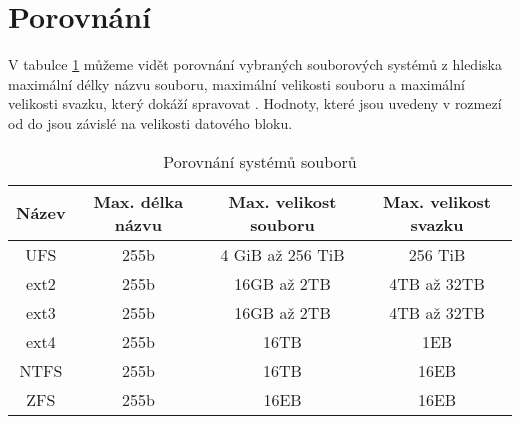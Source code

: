 \section{Porovnání}
    V tabulce \ref{fscompare} můžeme vidět porovnání vybraných souborových systémů z hlediska maximální délky názvu souboru, maximální velikosti souboru a maximální velikosti svazku, který dokáží spravovat \cite{data}. Hodnoty, které jsou uvedeny v rozmezí od do jsou závislé na velikosti datového bloku.
    \begin{table}
    \centering
    \caption{Porovnání systémů souborů}
    \label{fscompare}
    \begin{tabular}{|c|c|c|c|}
    \hline
    Název & Max. délka názvu & Max. velikost souboru & Max. velikost svazku \\ \hline
    UFS & 255b & 4 GiB až 256 TiB & 256 TiB \\ \hline
    ext2 & 255b & 16GB až 2TB & 4TB až 32TB \\ \hline
    ext3 & 255b & 16GB až 2TB & 4TB až 32TB \\ \hline
    ext4 & 255b & 16TB & 1EB \\ \hline
    NTFS & 255b & 16TB & 16EB \\ \hline
    ZFS & 255b & 16EB & 16EB \\ \hline
    \end{tabular}
    \end{table} 